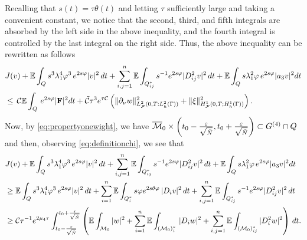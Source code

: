\documentclass[11pt,oneside,leqno]{amsart}
\numberwithin{equation}{section}
\numberwithin{equation}{section}
\newcommand{\E}{\mathbb{E}}
\begin{document}
Recalling that $s(t)=\tau\theta(t)$ and letting $\tau$ sufficiently large and taking a convenient constant, we notice that the second, third, and fifth integrals are absorbed by the left side in the above inequality, and the fourth integral is controlled by the last integral on the right side. Thus, the above inequality can be rewritten as follows
\begin{equation}\label{eq:absorbthecarleman}
\begin{split}
&J(v)+\E\int_{Q}s^{3}\lambda^{4}_{1}\varphi^{3}\,e^{2s\varphi}|v|^{2}\,dt+\sum_{i,j=1}^{n}\E\int_{Q_{ij}^{\ast}}s^{-1}e^{2s\varphi}|D_{ij}^2v|^2\, dt+\E\int_{Q}s\lambda_{1}^2\varphi\,e^{2s\varphi}|a_3 v|^2dt\\
&\leq\,\mathcal{C}\E\int_{Q}\,e^{2s\varphi}|\mathbf{F}|^2dt+\Tilde{\mathcal{C}}\tau^3e^{\tau\mathcal{C}}\left(\|{ \partial_{\nu}w}\|^2_{L^2_\mathcal{F}(0,T:L_h^2(\Gamma))}+\|\xi\|^2_{H^1_{\mathcal{F}}(0,T;H_h^1(\Gamma))}\right).
\end{split}
\end{equation}
Now, by \eqref{eq:propertyonewight}, we have $\overline{\mathcal{M}}_0\times \left(t_0-\frac{\varepsilon}{\sqrt{\Tilde{N}}},t_0+\frac{\varepsilon}{\sqrt{\Tilde{N}}}\right)\subset G^{(4)}\cap Q$ and then, observing \eqref{eq:definitionchi}, we see that
\begin{equation}\label{eq:estimateoftheleftside}
    \begin{split} &J(v)+\E\int_{Q}s^{3}\lambda^{4}_{1}\varphi^{3}\,e^{2s\varphi}|v|^{2}\,dt+\sum_{i,j=1}^{n}\E\int_{Q_{ij}^\ast}s^{-1}e^{2s\varphi}|D_{ij}^2v|^2\, dt+\E\int_{Q}s\lambda_{1}^2\varphi\,e^{2s\varphi}|a_3 v|^2dt\\
     &\geq   \E\int_{Q}s^{3}\lambda^{4}_{1}\varphi^{3}\,e^{2s\varphi}|v|^{2}\,dt+\sum_{i=1}^{n}\E\int_{Q_{i}^{\ast}}s\varphi e^{2s\theta\varphi}\,|D_{i}v|^{2}\,dt+\sum_{i,j=1}^{n}\E\int_{Q_{ij}^{\ast}}s^{-1}e^{2s\varphi}|D^2_{ij}v|^2\,dt\\
     &\geq \mathcal{C}\tau^{-1}e^{2\mu_4 \tau}\int_{t_0-\frac{\varepsilon}{\sqrt{\Tilde{N}}}}^{t_0+\frac{\varepsilon}{\sqrt{\Tilde{N}}}}\left(\E\int_{\mathcal{M}_0}|w|^{2}+\sum_{i=1}^{n}\E\int_{(\mathcal{M}_{0})_{i}^{\ast}}\,|D_{i}w|^{2}+\sum_{i,j=1}^{n}\E\int_{(\mathcal{M}_0)_{ij}^\ast}|D^2_i w|^2\right)\,dt.
    \end{split}
\end{equation}
\end{document}
